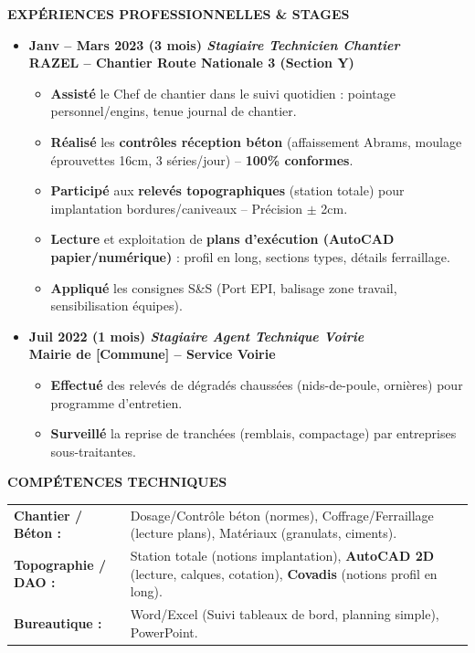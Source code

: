 \documentclass[11pt]{article}
\begin{document}
\begin{exoresolu}
\textbf{EXPÉRIENCES PROFESSIONNELLES \& STAGES}
\begin{itemize}
    \item \textbf{Janv -- Mars 2023 (3 mois) \hfill \emph{Stagiaire Technicien Chantier}} \\
    \textbf{RAZEL -- Chantier Route Nationale 3 (Section Y)} \\
    \begin{itemize}
        \item \textbf{Assisté} le Chef de chantier dans le suivi quotidien : pointage personnel/engins, tenue journal de chantier.
        \item \textbf{Réalisé} les \textbf{contrôles réception béton} (affaissement Abrams, moulage éprouvettes 16cm, 3 séries/jour) -- \textbf{100\% conformes}.
        \item \textbf{Participé} aux \textbf{relevés topographiques} (station totale) pour implantation bordures/caniveaux -- Précision $\pm$ 2cm.
        \item \textbf{Lecture} et exploitation de \textbf{plans d'exécution (AutoCAD papier/numérique)} : profil en long, sections types, détails ferraillage.
        \item \textbf{Appliqué} les consignes S\&S (Port EPI, balisage zone travail, sensibilisation équipes).
    \end{itemize}
    \item \textbf{Juil 2022 (1 mois) \hfill \emph{Stagiaire Agent Technique Voirie}} \\
    \textbf{Mairie de [Commune] -- Service Voirie} \\
    \begin{itemize}
        \item \textbf{Effectué} des relevés de dégradés chaussées (nids-de-poule, ornières) pour programme d'entretien.
        \item \textbf{Surveillé} la reprise de tranchées (remblais, compactage) par entreprises sous-traitantes.
    \end{itemize}
\end{itemize}

\textbf{COMPÉTENCES TECHNIQUES}
\begin{tabular}{ll}
\textbf{Chantier / Béton :} & Dosage/Contrôle béton (normes), Coffrage/Ferraillage (lecture plans), Matériaux (granulats, ciments). \\
\textbf{Topographie / DAO :} & Station totale (notions implantation), \textbf{AutoCAD 2D} (lecture, calques, cotation), \textbf{Covadis} (notions profil en long). \\
\textbf{Bureautique :} & Word/Excel (Suivi tableaux de bord, planning simple), PowerPoint.
\end{tabular}


\end{exoresolu}
\end{document}
